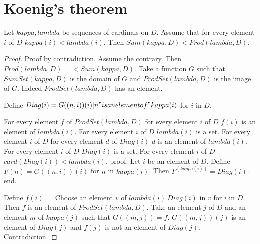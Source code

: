 \documentclass{article}
\begin{document}
  \section*{Koenig's theorem}

  \begin{forthel}
    \begin{theorem}[Koenig]
      Let $kappa, lambda$ be sequences of cardinals on $D$. Assume that for every element $i$ of $D$ $kappa(i) < lambda(i)$. Then $Sum(kappa,D) < Prod(lambda,D)$.
    \end{theorem}
    \begin{proof}
      Proof by contradiction. Assume the contrary. Then $Prod(lambda,D) =< Sum(kappa,D)$.
      Take a function $G$ such that $SumSet(kappa,D)$ is the domain of $G$ and $ProdSet(lambda,D)$ is the image of $G$.
      Indeed $ProdSet(lambda, D)$ has an element.
      
      Define $Diag(i) = {G((n,i))(i) | n "is an element of" kappa(i)}$ for $i$ in $D$.

      For every element $f$ of $ProdSet(lambda, D)$ for every element $i$ of $D$ $f(i)$ is an element of $lambda(i)$.
      For every element $i$ of $D$ $lambda(i)$ is a set.
      For every element $i$ of $D$ for every element $d$ of $Diag(i)$ $d$ is an element of $lambda(i)$.
      For every element $i$ of $D$ $Diag(i)$ is a set.
      For every element $i$ of $D$ $card(Diag(i)) < lambda(i)$.
      proof.
        Let $i$ be an element of $D$. Define $F(n) = G((n,i))(i)$ for $n$ in $kappa(i)$. Then $F^(kappa(i)) = Diag(i)$.
      end.

      Define $f(i) =$ Choose an element $v$ of $lambda(i) \ Diag(i)$ in $v$ for $i$ in $D$. Then $f$ is an element of $ProdSet(lambda,D)$. Take an element $j$ of $D$ and an element $m$ of $kappa(j)$ such that $G((m,j)) = f$. $G((m,j))(j)$ is an element of $Diag(j)$ and $f(j)$ is not an element of $Diag(j)$. Contradiction.
    \end{proof}
  \end{forthel}
\end{document}
